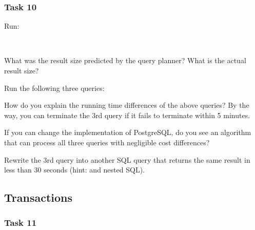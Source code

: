 \subsubsection{Task 10}

\noindent Run:

\vgap

\noindent {} \\

\vgap

\noindent What was the result size predicted by the query planner? What is the actual result size?

\vgap

\noindent Run the following three queries:


\noindent How do you explain the running time differences of the above queries? By the way, you can terminate the 3rd query if it fails to terminate within 5 minutes.

\vgap

\noindent If you can change the implementation of PostgreSQL, do you see an algorithm that can process all three queries with negligible cost differences?

\vgap

Rewrite the 3rd query into another SQL query that returns the same result in less than 30 seconds (hint:  and nested SQL).


\subsection{Transactions}

\subsubsection{Task 11}

